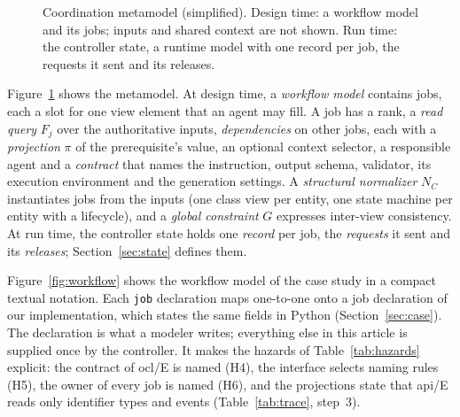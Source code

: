 \documentclass[pdflatex,sn-mathphys-num]{sn-jnl}
\theoremstyle{thmstyleone}%
\theoremstyle{thmstyletwo}%
\theoremstyle{thmstylethree}%
\newcommand{\vw}[1]{\textsf{#1}}
\begin{document}
\begin{figure}[!ht]
\caption{Coordination metamodel (simplified). Design time: a workflow model and its jobs; inputs and shared context are not shown. Run time: the controller state, a runtime model with one record per job, the requests it sent and its releases.}\label{fig:metamodel}
\end{figure}

Figure~\ref{fig:metamodel} shows the metamodel. At design time, a \emph{workflow model} contains jobs, each a slot for one view element that an agent may fill. A job has a rank, a \emph{read query} $F_j$ over the authoritative inputs, \emph{dependencies} on other jobs, each with a \emph{projection} $\pi$ of the prerequisite's value, an optional context selector, a responsible agent and a \emph{contract} that names the instruction, output schema, validator, its execution environment and the generation settings. A \emph{structural normalizer} $N_C$ instantiates jobs from the inputs (one class view per entity, one state machine per entity with a lifecycle), and a \emph{global constraint} $G$ expresses inter-view consistency. At run time, the controller state holds one \emph{record} per job, the \emph{requests} it sent and its \emph{releases}; Section~\ref{sec:state} defines them.

Figure~\ref{fig:workflow} shows the workflow model of the case study in a compact textual notation. Each \texttt{job} declaration maps one-to-one onto a job declaration of our implementation, which states the same fields in Python (Section~\ref{sec:case}). The declaration is what a modeler writes; everything else in this article is supplied once by the controller. It makes the hazards of Table~\ref{tab:hazards} explicit: the contract of \vw{ocl/E} is named (H4), the interface selects naming rules (H5), the owner of every job is named (H6), and the projections state that \vw{api/E} reads only identifier types and events (Table~\ref{tab:trace}, step~3).
\end{document}
